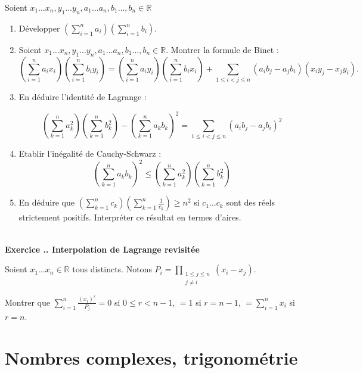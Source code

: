 \documentclass{article}
\newcommand{\mb}[1]{\mathbb{#1}}
\newcounter{exo}
\newcommand{\exercice}[1][\null]{\textbf{\\ \large Exercice \thesection.\theexo. \normalsize #1} \addtocounter{exo}{1}}
\begin{document}
Soient $x_1 \dots x_n, y_1 \dots y_n, a_1 \dots a_n, b_1 \dots, b_n \in \mb{R}$

\begin{enumerate}

\item Développer $\displaystyle \left(\sum_{i=1}^n a_i \right)\left(\sum_{i=1}^n b_i \right)$.

\item Soient $x_1 \dots x_n, y_1 \dots y_n, a_1 \dots a_n, b_1 \dots, b_n \in \mb{R}$. Montrer la formule de Binet :
$$ \left(\sum_{i=1}^n a_i x_i\right)\left(\sum_{i=1}^n b_i y_i\right) = \displaystyle \left(\sum_{i=1}^n a_i y_i\right)\left(\sum_{i=1}^n b_i x_i\right) + \sum_{1 \le i < j \le n} (a_i b_j - a_j b_i)(x_i y_j - x_j y_i).$$

\item En déduire l'identité de Lagrange :

$$\displaystyle \left(\sum_{k=1}^n a_k^2\right)\left(\sum_{k=1}^n b_k^2\right) - \left(\sum_{k=1}^n a_k b_k\right)^2 = \sum_{1 \le i < j \le n} (a_i b_j - a_j b_i)^2$$


\item Etablir l'inégalité de Cauchy-Schwarz :
$$\displaystyle \left(\sum_{k=1}^n a_k b_k\right)^2 \le \left(\sum_{k=1}^n a_k^2\right)\left(\sum_{k=1}^n b_k^2\right)$$

\item En déduire que $ \displaystyle \left(\sum_{k=1}^n c_k\right)\left(\sum_{k=1}^n \frac{1}{c_k}\right) \ge n^2$ si $c_1 \dots c_k$ sont des réels strictement positifs. Interpréter ce résultat en termes d'aires.

\end{enumerate}


\exercice[Interpolation de Lagrange revisitée]

Soient $x_1 \dots x_n \in \mb{R}$ tous distincts. Notons $\displaystyle P_i =  \prod_{\substack{1 \le j \le n \\ j \neq i}} (x_i - x_j)$.

Montrer que $\displaystyle \sum_{i=1}^n \frac{(x_i)^r}{P_j} = 0$ si $0 \le r < n-1$,  $=1$ si $r = n-1$, $=\displaystyle \sum_{i=1}^n x_i$ si $r = n$.






\section{Nombres complexes, trigonométrie}
\end{document}
